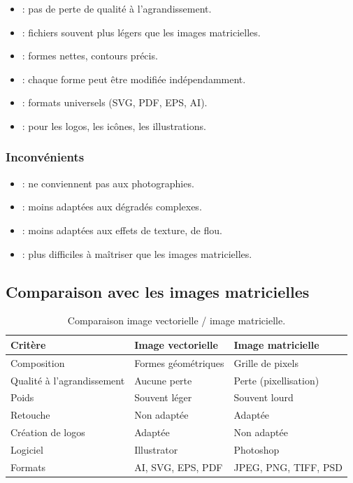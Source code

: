 \begin{itemize}
    \item {} : pas de perte de qualité à l'agrandissement.
    \item {} : fichiers souvent plus légers que les images matricielles.
    \item {} : formes nettes, contours précis.
    \item {} : chaque forme peut être modifiée indépendamment.
    \item {} : formats universels (SVG, PDF, EPS, AI).
    \item {} : pour les logos, les icônes, les illustrations.
\end{itemize}

\subsubsection{Inconvénients}

\begin{itemize}
    \item {} : ne conviennent pas aux photographies.
    \item {} : moins adaptées aux dégradés complexes.
    \item {} : moins adaptées aux effets de texture, de flou.
    \item {} : plus difficiles à maîtriser que les images matricielles.
\end{itemize}

\subsection{Comparaison avec les images matricielles}

\begin{table}[h!]
\centering
\begin{tabular}{@{}p{4cm}p{5cm}p{5cm}@{}}
\toprule
\textbf{Critère} & \textbf{Image vectorielle} & \textbf{Image matricielle} \\
\midrule
Composition & Formes géométriques & Grille de pixels \\
Qualité à l'agrandissement & Aucune perte & Perte (pixellisation) \\
Poids & Souvent léger & Souvent lourd \\
Retouche & Non adaptée & Adaptée \\
Création de logos & Adaptée & Non adaptée \\
Logiciel & Illustrator & Photoshop \\
Formats & AI, SVG, EPS, PDF & JPEG, PNG, TIFF, PSD \\
\bottomrule
\end{tabular}
\caption{Comparaison image vectorielle / image matricielle.}
\end{table}

